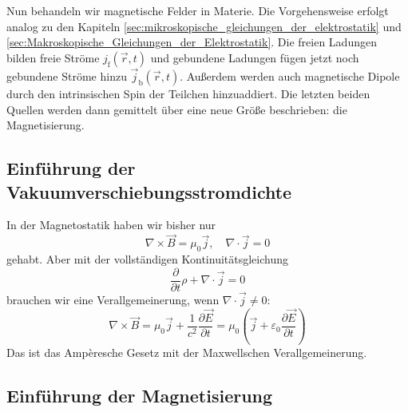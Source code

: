 Nun behandeln wir magnetische Felder in Materie. Die Vorgehensweise erfolgt analog zu den Kapiteln \ref{sec:mikroskopische_gleichungen_der_elektrostatik} und \ref{sec:Makroskopische_Gleichungen_der_Elektrostatik}. Die freien Ladungen bilden freie Ströme $j_{\mathrm{f}}\left(\vec {r},t\right)$ und gebundene Ladungen fügen jetzt noch gebundene Ströme hinzu $\vec {j}_{\mathrm{b}}\left(\vec {r},t\right)$. Außerdem werden auch magnetische Dipole durch den intrinsischen Spin der Teilchen hinzuaddiert. Die letzten beiden Quellen werden dann gemittelt über eine neue Größe beschrieben: die Magnetisierung.

\subsection{Einführung der Vakuumverschiebungsstromdichte}

In der Magnetostatik haben wir bisher nur
\begin{equation*}
	\nabla \times \vec {B}=\mu _{0}\vec {j},\quad\nabla \cdot \vec {j}=0
\end{equation*}
gehabt. Aber mit der vollständigen Kontinuitätsgleichung
\begin{equation*}
	\frac{\partial }{\partial t}\rho +\nabla \cdot \vec {j}=0
\end{equation*}
brauchen wir eine Verallgemeinerung, wenn $\nabla \cdot \vec {j}\neq 0$:
\begin{equation*}
	\nabla \times \vec {B}=\mu _{0}\vec {j}+\frac{1}{c^{2}}\frac{\partial \vec {E}}{\partial t}=\mu _{0}\left(\vec {j}+\varepsilon _{0}\frac{\partial \vec {E}}{\partial t}\right)
\end{equation*}
Das ist das Ampèresche Gesetz mit der Maxwellschen Verallgemeinerung.

\subsection{Einführung der Magnetisierung}

